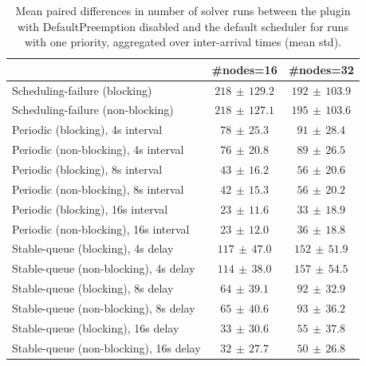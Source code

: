 \begin{table}[t]
\tiny
\setlength{\tabcolsep}{1.2pt}
\renewcommand{\arraystretch}{1.12}
\centering
\caption{Mean paired differences in number of solver runs between the plugin with DefaultPreemption disabled and the default scheduler for runs with one priority, aggregated over inter-arrival times (mean \pm std).}
\label{tab:solver_runs-defpreempt0-prio1-std1-agg-arrival}
\begin{tabular}{l c c}
\toprule
 & \#nodes=16 & \#nodes=32 \\
\midrule
Scheduling-failure (blocking) & $218\,\pm\,129.2$ & $192\,\pm\,103.9$ \\
Scheduling-failure (non-blocking) & $218\,\pm\,127.1$ & $195\,\pm\,103.6$ \\
Periodic (blocking), 4s interval & $78\,\pm\,25.3$ & $91\,\pm\,28.4$ \\
Periodic (non-blocking), 4s interval & $76\,\pm\,20.8$ & $89\,\pm\,26.5$ \\
Periodic (blocking), 8s interval & $43\,\pm\,16.2$ & $56\,\pm\,20.6$ \\
Periodic (non-blocking), 8s interval & $42\,\pm\,15.3$ & $56\,\pm\,20.2$ \\
Periodic (blocking), 16s interval & $23\,\pm\,11.6$ & $33\,\pm\,18.9$ \\
Periodic (non-blocking), 16s interval & $23\,\pm\,12.0$ & $36\,\pm\,18.8$ \\
Stable-queue (blocking), 4s delay & $117\,\pm\,47.0$ & $152\,\pm\,51.9$ \\
Stable-queue (non-blocking), 4s delay & $114\,\pm\,38.0$ & $157\,\pm\,54.5$ \\
Stable-queue (blocking), 8s delay & $64\,\pm\,39.1$ & $92\,\pm\,32.9$ \\
Stable-queue (non-blocking), 8s delay & $65\,\pm\,40.6$ & $93\,\pm\,36.2$ \\
Stable-queue (blocking), 16s delay & $33\,\pm\,30.6$ & $55\,\pm\,37.8$ \\
Stable-queue (non-blocking), 16s delay & $32\,\pm\,27.7$ & $50\,\pm\,26.8$ \\
\bottomrule
\end{tabular}
\end{table}
